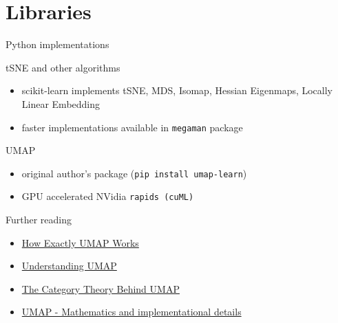 \documentclass[unknownkeysallowed]{beamer}
\begin{document}
\section{Libraries}
\begin{frame}{Python implementations}

	\begin{block}{tSNE and other algorithms}
		\begin{itemize}
			\item scikit-learn implements tSNE, MDS, Isomap, Hessian Eigenmaps, Locally Linear Embedding
			\item faster implementations available in \texttt{megaman} package
		\end{itemize}
	\end{block}
	
	\begin{block}{UMAP}
		\begin{itemize}
			\item original author's package (\texttt{pip install umap-learn})
			\item GPU accelerated NVidia \texttt{rapids (cuML)} 
		\end{itemize}
	\end{block}
\end{frame}



\begin{frame}{Further reading}

	\begin{itemize}
		\item \href{https://towardsdatascience.com/how-exactly-umap-works-13e3040e1668}{How Exactly UMAP Works}
		\item \href{https://pair-code.github.io/understanding-umap/}{Understanding UMAP}
		\item \href{https://johncarlosbaez.wordpress.com/2020/02/10/the-category-theory-behind-umap/}{The Category Theory Behind UMAP}
		\item \href{https://www.slideshare.net/UmbertoLupo/umap-mathematics-and-implementational-details}{
UMAP - Mathematics and implementational details
}
	\end{itemize}
\end{frame}
\end{document}
